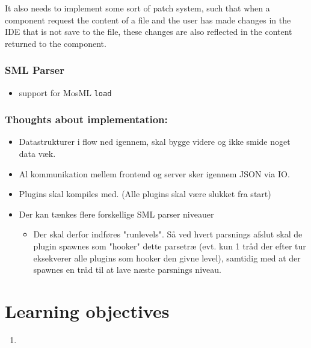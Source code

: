 \documentclass[a4paper,oneside]{memoir}
\begin{document}
It also needs to implement some sort of patch system, such that when a component
request the content of a file and the user has made changes in the IDE that is
not save to the file, these changes are also reflected in the content returned
to the component. 


\subsubsection{SML Parser}
\begin{itemize}
\item support for MosML \texttt{load}
\end{itemize}


\subsubsection{Thoughts about implementation:}
\begin{itemize}
\item Datastrukturer i flow ned igennem, skal bygge videre og ikke smide noget
  data væk.

\item Al kommunikation mellem frontend og server sker igennem JSON via IO.

\item Plugins skal kompiles med. (Alle plugins skal være slukket fra start)


\item Der kan tænkes flere forskellige SML parser niveauer
  \begin{itemize}

  \item Der skal derfor indføres "runlevels". Så ved hvert parsnings
    afslut skal de plugin spawnes som "hooker" dette parsetræ
    (evt. kun 1 tråd der efter tur eksekverer alle plugins som hooker
    den givne level), samtidig med at der spawnes en tråd til at lave
    næste parsnings niveau.
  \end{itemize}
\end{itemize}

\section{Learning objectives}

\begin{enumerate}
\item
\end{enumerate}
\end{document}
